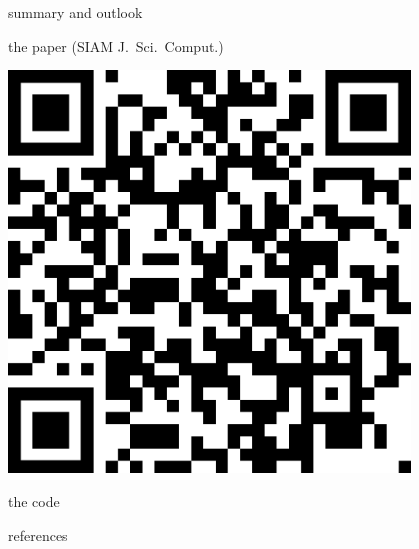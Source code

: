 \documentclass[svgnames,
               hyperref={colorlinks,citecolor=DeepPink4,linkcolor=FireBrick,urlcolor=Maroon},
               usepdftitle=false]  %
               {beamer}
\begin{document}
\begin{frame}{summary and outlook}
\begin{minipage}[T]{0.35\textwidth}
\scriptsize the paper (SIAM J.~Sci.~Comput.)
\end{minipage}
\hfill
\begin{minipage}[T]{0.25\textwidth}
\vspace{0pt}

\hfill \includegraphics[width=0.8\textwidth]{figs/QRfascd.png}

\scriptsize \hfill the code
\end{minipage}
\end{frame}


\appendix

\begin{frame}{references}

{\footnotesize

}
\end{frame}
\end{document}
